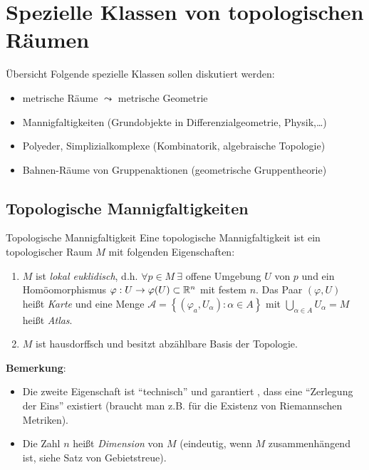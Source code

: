 \chapter{Spezielle Klassen von topologischen Räumen}

\begin{bla}{Übersicht}
  Folgende spezielle Klassen sollen diskutiert werden:
  \begin{itemize}
    \item metrische Räume $ \leadsto $ metrische Geometrie
    \item Mannigfaltigkeiten (Grundobjekte in Differenzialgeometrie, Physik,\dots)
    \item Polyeder, Simplizialkomplexe (Kombinatorik, algebraische Topologie)
    \item Bahnen-Räume von Gruppenaktionen (geometrische Gruppentheorie)
  \end{itemize}
\end{bla}

\section{Topologische Mannigfaltigkeiten}

\begin{definition}{Topologische Mannigfaltigkeit}
  Eine topologische Mannigfaltigkeit ist ein topologischer Raum $ M $ mit folgenden Eigenschaften:
  \begin{enumerate}
    \item $ M $ ist \emph{lokal euklidisch}, d.h. $ \forall p \in M \ \exists $ offene Umgebung $ U $ von $ p $ und ein Homöomorphismus $ \varphi: U \to \varphi(U) \subset \mathbb{R}^n $ mit festem $ n $. Das Paar $ (\varphi, U) $ heißt \emph{Karte} und eine Menge $ \mathcal{A} = \left\{ (\varphi_a, U_\alpha) : \alpha \in A \right\} $ mit $ \bigcup_{\alpha \in A}U_\alpha = M $ heißt \emph{Atlas}.
    \item $ M $ ist hausdorffsch und besitzt abzählbare Basis der Topologie.
  \end{enumerate}
  \textbf{Bemerkung}:
  \begin{itemize}
    \item Die zweite Eigenschaft ist ``technisch'' und garantiert , dass eine ``Zerlegung der Eins'' existiert (braucht man z.B. für die Existenz von Riemannschen Metriken). 
    \item Die Zahl $ n $ heißt \emph{Dimension} von $ M $ (eindeutig, wenn $ M $ zusammenhängend ist, siehe Satz von Gebietstreue). 
  \end{itemize}
\end{definition}

